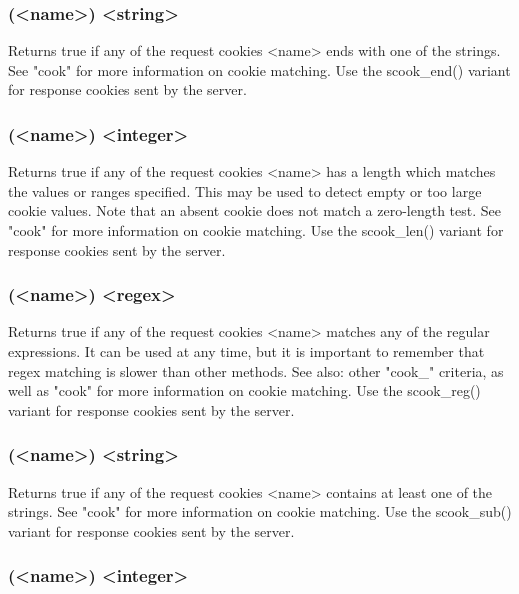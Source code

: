 \subsubsection[cook\_end]{(<name>) <string>}

  Returns true if any of the request cookies <name> ends with one of the
  strings. See "cook" for more information on cookie matching. Use the
  scook\_end() variant for response cookies sent by the server.

\subsubsection[cook\_len]{(<name>) <integer>}

  Returns true if any of the request cookies <name> has a length which matches
  the values or ranges specified. This may be used to detect empty or too large
  cookie values. Note that an absent cookie does not match a zero-length test.
  See "cook" for more information on cookie matching. Use the scook\_len()
  variant for response cookies sent by the server.

\subsubsection[cook\_reg]{(<name>) <regex>}

  Returns true if any of the request cookies <name> matches any of the regular
  expressions. It can be used at any time, but it is important to remember that
  regex matching is slower than other methods. See also: other "cook\_" criteria,
  as well as "cook" for more information on cookie matching. Use the
  scook\_reg() variant for response cookies sent by the server.

\subsubsection[cook\_sub]{(<name>) <string>}

  Returns true if any of the request cookies <name> contains at least one of
  the strings. See "cook" for more information on cookie matching. Use the
  scook\_sub() variant for response cookies sent by the server.

\subsubsection[cook\_val]{(<name>) <integer>}

